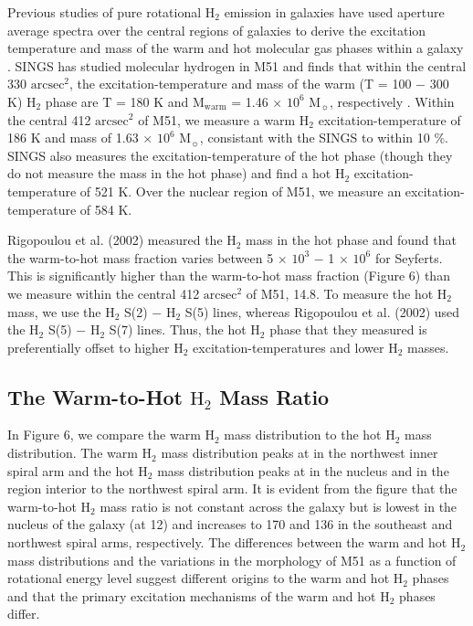 \documentclass[manuscript]{aastex}
\begin{document}
Previous studies of pure rotational $\mathrm{H_2}$ emission in galaxies have used aperture average spectra over the central regions of galaxies to derive the excitation temperature and mass of the warm and hot molecular gas phases within a galaxy \citep{rig02, hig06, rou07}.  SINGS has studied molecular hydrogen in M51 and finds that within the central 330 $\mathrm{arcsec^2}$, the excitation-temperature and mass of the warm (T = 100 $-$ 300 K) $\mathrm{H_2}$ phase are T = 180 K and $\mathrm{M_{warm}}$ = 1.46 $\times$ $\mathrm{10^6}$ $\mathrm{M_\sun}$, respectively \citep{rou07}.  Within the central 
412 $\mathrm{arcsec^2}$ of M51, we measure a warm $\mathrm{H_2}$ excitation-temperature of 186 K and mass of 1.63 $\times$ $\mathrm{10^6}$ $\mathrm{M_\sun}$, consistant with the SINGS to within 10 \%.  SINGS also measures the excitation-temperature of the hot phase (though they do not measure the mass in the hot phase) and find a hot $\mathrm{H_2}$ excitation-temperature of 521 K.  Over the nuclear region of M51, we measure an excitation-temperature of 584 K.  

Rigopoulou et al. (2002) measured the $\mathrm{H_2}$ mass in the hot phase and found that the warm-to-hot mass fraction varies between 5 $\times$ $\mathrm{10^3}$ $-$ 1 $\times$ $\mathrm{10^6}$ for Seyferts.  This is significantly higher than the warm-to-hot mass fraction (Figure 6) than we measure within the central 412 $\mathrm{arcsec^2}$ of M51, 14.8.  To measure the hot $\mathrm{H_2}$ mass, we use the $\mathrm{H_2}$ S(2) $-$ $\mathrm{H_2}$ S(5) lines, whereas Rigopoulou et al. (2002) used the $\mathrm{H_2}$ S(5) $-$ $\mathrm{H_2}$ S(7) lines.  Thus, the hot $\mathrm{H_2}$ phase that they measured is preferentially offset to higher $\mathrm{H_2}$ excitation-temperatures and lower $\mathrm{H_2}$ masses.  

\subsection{The Warm-to-Hot $\mathrm{H_2}$ Mass Ratio}

In Figure 6, we compare the warm $\mathrm{H_2}$ mass distribution to the hot $\mathrm{H_2}$ mass distribution.  The warm $\mathrm{H_2}$ mass distribution peaks at 
in the northwest inner spiral arm and the hot $\mathrm{H_2}$ mass distribution peaks at
in the nucleus and in the region interior to the northwest spiral arm.  It is evident from the figure that the warm-to-hot $\mathrm{H_2}$ mass ratio is not constant across the galaxy but is lowest in the nucleus of the galaxy (at 12) and increases to 170 and 136 in the southeast and northwest spiral arms, respectively.  The differences between the warm and hot $\mathrm{H_2}$ mass distributions and the variations in the morphology of M51 as a  function of rotational energy level suggest different origins to the warm and hot $\mathrm{H_2}$ phases and that the primary excitation mechanisms of the warm and hot $\mathrm{H_2}$ phases differ.  
 
\end{document}
